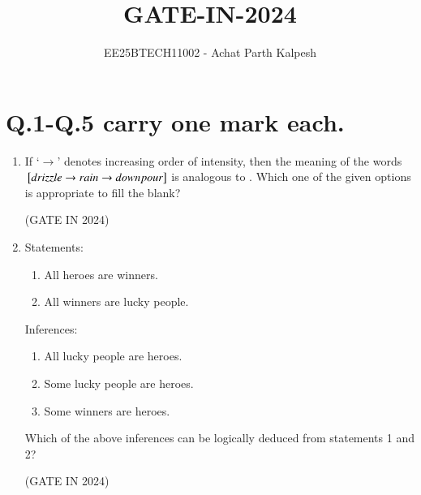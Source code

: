 \documentclass[journal,12pt,onecolumn]{IEEEtran}
\title{GATE-IN-2024}
\author{EE25BTECH11002 - Achat Parth Kalpesh }
\date{}
\theoremstyle{remark}
\begin{document}
\maketitle
\section*{Q.1-Q.5 carry one mark each. }

\begin{enumerate}
    \item If `$\rightarrow$' denotes increasing order of intensity, then the meaning of the words
    ${}\left[drizzle \rightarrow rain \rightarrow downpour \right]$ is analogous to .
    Which one of the given options is appropriate to fill the blank?
    
    \hfill{(GATE IN 2024)}
    \begin{enumerate}
    \end{enumerate}

    \item Statements:
    \begin{enumerate}
        \item All heroes are winners.
        \item All winners are lucky people.
    \end{enumerate}
    Inferences:
    \begin{enumerate}
        \item All lucky people are heroes.
        \item Some lucky people are heroes.
        \item Some winners are heroes.
    \end{enumerate}
    Which of the above inferences can be logically deduced from statements 1 and 2?
    
    \hfill{(GATE IN 2024)}
    \begin{enumerate}
    \end{enumerate}


\end{enumerate}
\end{document}
